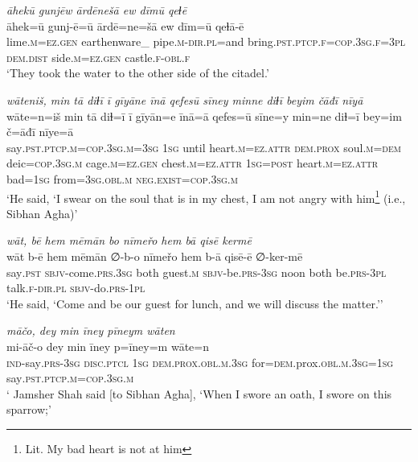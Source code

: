 \ea \label{DP.32}
\textit{āhekū gunjēw ārdēnešā ew dīmū qeɫē} \\ 
\gll āhek=ū gunj-ē=ū ārdē=ne=šā ew dīm=ū qeɫā-ē \\ 
 lime\textsc{.m}\textsc{=ez}\textsc{.gen} earthenware\_ pipe\textsc{.m}\textsc{-dir}\textsc{.pl}=and bring\textsc{.pst}\textsc{.ptcp}\textsc{\textsc{.f}}\textsc{=cop}\textsc{.3sg}\textsc{\textsc{.f}}\textsc{=3pl} \textsc{dem.dist} side\textsc{.m}\textsc{=ez}\textsc{.gen} castle\textsc{\textsc{.f}}\textsc{-obl}\textsc{\textsc{.f}} \\ 
\glt `They took the water to the other side of the citadel.'
\z 
 
\ea \label{DP.38}
\textit{wāteniš, min tā diɫī ī gīyāne īnā qefesū sīney minne diɫī beyim čāđī nīyā} \\ 
\gll wāte=n=iš min tā diɫ=ī ī gīyān=e īnā=ā qefes=ū sīne=y min=ne diɫ=ī bey=im č=āđī nīye=ā \\ 
 say\textsc{.pst}\textsc{.ptcp}\textsc{.m}\textsc{=cop}\textsc{.3sg}\textsc{.m}\textsc{=3sg} \textsc{1sg} until heart\textsc{.m}\textsc{=ez}.\textsc{attr} \textsc{dem.prox} soul\textsc{.m}\textsc{=dem} deic\textsc{=cop}\textsc{.3sg}\textsc{.m} cage\textsc{.m}\textsc{=ez}\textsc{.gen} chest\textsc{.m}\textsc{=ez}.\textsc{attr} \textsc{1sg}\textsc{=\textsc{post}} heart\textsc{.m}\textsc{=ez}.\textsc{attr} bad\textsc{=1sg} from\textsc{=3sg}\textsc{.obl}\textsc{.m} \textsc{\textsc{neg.}exist}\textsc{=cop}\textsc{.3sg}\textsc{.m} \\ 
\glt `He said, ‘I swear on the soul that is in my chest, I am not angry with him\footnote{Lit. My bad heart is not at him} (i.e., Sibhan Agha)'
\z 
 
\ea \label{DP.44}
\textit{wāt, bē hem mēmān bo nīmeřo hem bā qisē kermē} \\ 
\gll wāt b-ē hem mēmān ∅-b-o nīmeřo hem b-ā qisē-ē ∅-ker-mē \\ 
 say\textsc{.pst} \textsc{sbjv-}come\textsc{.prs}\textsc{.3sg} both guest\textsc{.m} \textsc{sbjv-}be\textsc{.prs}\textsc{-3sg} noon both be\textsc{.prs}\textsc{-3pl} talk\textsc{\textsc{.f}}\textsc{-dir}\textsc{.pl} \textsc{sbjv-}do\textsc{.prs}\textsc{-1pl} \\ 
\glt `He said, ‘Come and be our guest for lunch, and we will discuss the matter.’'
\z 
 
\ea \label{DP.48}
\textit{māčo, dey min īney pīneym wāten} \\ 
\gll mi-āč-o dey min īney p=īney=m wāte=n \\ 
 \textsc{ind-}say\textsc{.prs}\textsc{-3sg} \textsc{disc.ptcl} \textsc{1sg} \textsc{dem.prox}\textsc{.obl}\textsc{.m}\textsc{.3sg} for\textsc{=dem}.prox\textsc{.obl}\textsc{.m}\textsc{.3sg}\textsc{=1sg} say\textsc{.pst}\textsc{.ptcp}\textsc{.m}\textsc{=cop}\textsc{.3sg}\textsc{.m} \\ 
\glt ` Jamsher Shah said [to Sibhan Agha], ‘When I swore an oath, I swore on this sparrow;'
\z 
 
